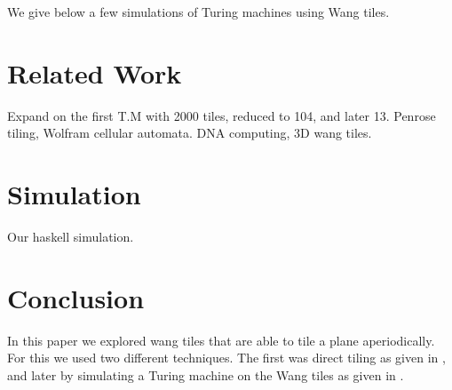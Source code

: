 \documentclass{article}
\begin{document}
We give below a few simulations of Turing machines using Wang tiles.


\section*{Related Work}
Expand on the first T.M with 2000 tiles, reduced to 104, and later 13. Penrose tiling, Wolfram cellular automata. DNA computing, 3D wang tiles.

\section*{Simulation}
Our haskell simulation.

\section*{Conclusion}
In this paper we explored wang tiles that are able to tile a plane aperiodically. For this we used two different techniques. The first was direct tiling as given in \cite{tilings}, and later by simulating a Turing machine on the Wang tiles as given in \cite{tmtiles}.

\end{document}
